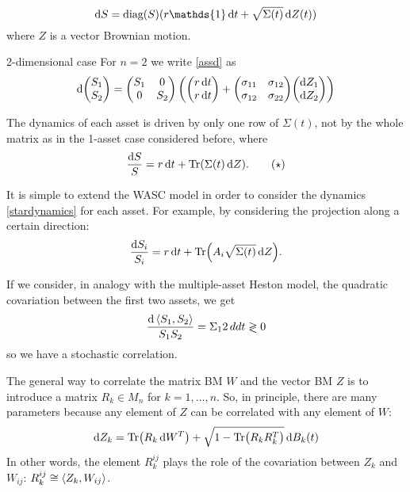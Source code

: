 \begin{equation}\label{assd}
    \dd S = \diag{S}(r\mathds{1}\,\dd t + \sqrt{\Sigma(t)}\,\dd Z(t))
\end{equation}
where $Z$ is a vector Brownian motion.
\begin{example}{2-dimensional case}{}{}
    For $n=2$ we write \eqref{assd} as
    \begin{align*}
        \dd\mqty(S_1 \\ S_2) = \mqty(S_1 & 0 \\ 0 & S_2)\left(\mqty(r\,\dd t \\ r\,\dd t) + \mqty(\sigma_{11} & \sigma_{12} \\ \sigma_{12} & \sigma_{22})\mqty(\dd Z_1 \\ \dd Z_2)\right)
    \end{align*}
\end{example}
\begin{remark}
    The dynamics of each asset is driven by only one row of $\Sigma(t)$, not by the whole matrix as in the 1-asset case considered before, where
    \begin{align}\label{stardynamics}
        \frac{\dd S}{S} = r\,\dd t + \Tr(\Sigma(t)\,\dd Z). \tag{$\star$}
    \end{align}
\end{remark}
\begin{remark}
    It is simple to extend the WASC model in order to consider the dynamics \eqref{stardynamics} for each asset. For example, by considering the projection along a certain direction:
    \begin{align*}
        \dfrac{\dd S_i}{S_i} = r\,\dd t + \Tr(A_i\sqrt{\Sigma(t)}\,\dd Z).
    \end{align*}
\end{remark}
\begin{remark}
    If we consider, in analogy with the multiple-asset Heston model, the quadratic covariation between the first two assets, we get
    \begin{align*}
        \frac{\dd\expval{S_1,S_2}}{S_1S_2} = \Sigma_12 \,dd t \gtrless 0
    \end{align*}
    so we have a stochastic correlation.
\end{remark}
\begin{remark}
    The general way to correlate the matrix BM $W$ and the vector BM $Z$ is to introduce a matrix $R_k\in M_n$ for $k=1,\dots,n$. So, in principle, there are many parameters because any element of $Z$ can be correlated with any element of $W$:
    \begin{align}
        \dd Z_k = \Tr(R_k\,\dd W^T) + \sqrt{1-\Tr(R_kR_k^T)}\,\dd B_k(t)
    \end{align}
    In other words, the element $R_k^{ij}$ plays the role of the covariation between $Z_k$ and $W_{ij}$: $R_k^{ij} \cong \expval{Z_k, W_{ij}}$.
\end{remark}
